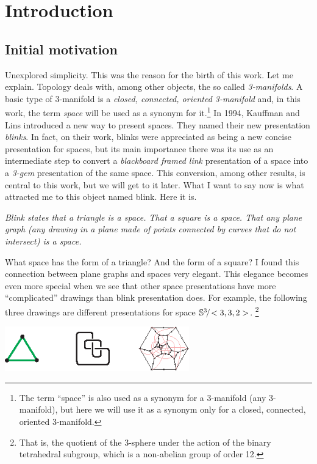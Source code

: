 \chapter{Introduction}

\vspace{-1cm}
\section{Initial motivation}
\label{sec:initialMotivation}

Unexplored simplicity. This was the reason for the birth of this work.
Let me explain. Topology deals with, among other objects, the so
called {\em 3-manifolds}. A basic type of 3-manifold is a {\em
closed, connected, oriented 3-manifold} and, in this work, the term
{\em space} will be used as a synonym for it.\footnote{The term
``space'' is also used as a synonym for a 3-manifold (any
3-manifold), but here we will use it as a synonym only for a closed,
connected, oriented 3-manifold.} In 1994, Kauffman and Lins
\cite{KauffmanAndLins1994} introduced a new way to present spaces.
They named their new presentation {\em blinks}. In fact, on their
work, blinks were appreciated as being a new concise presentation
for spaces, but its main importance there was its use as an
intermediate step to convert a {\em blackboard framed link}
presentation of a space into a {\em 3-gem} presentation of the same
space. This conversion, among other results, is central to this work,
but we will get to it later. What I want to say now is what
attracted me to this object named blink. Here it is.
\vspace{-0.3cm}
{\begin{center} \it
Blink states that a triangle is a space. That a square is a space.
That any plane graph (\ie any drawing in a plane made of
points connected by curves that do not intersect) is a space.
\end{center}}
\vspace{-0.3cm}
\noindent What space has the form of a
triangle? And the form of a square? I found this connection
between plane graphs and spaces very elegant. This elegance
becomes even more special when we see that other space
presentations have more ``complicated'' drawings than
blink presentation does. For example, the following three
drawings are different presentations for space $\mathbb{S}^3\!/\!<3,3,2>$. \footnote{That is, the quotient of the $3$-sphere
under the action of the binary tetrahedral subgroup, which is a non-abelian group of order 12.}
\begin{center}
\includegraphics[width=8cm]{fig/presentations.eps}
\end{center}
